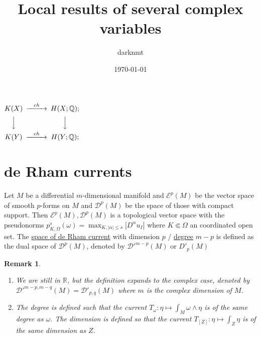 \documentclass[11pt]{article}
\author{darknmt}
\date{\today}
\title{Local results of several complex variables}
\newtheorem{remark}{Remark}
\begin{document}
\maketitle
\tableofcontents

\iffalse
\begin{info}
The PDF version of this page can be downloaded by replacing \texttt{html} in the its address by
\texttt{pdf}. 
For example \texttt{/html/sheaf-cohomology.html} should become \texttt{/pdf/sheaf-cohomology.pdf}.
\end{info}
\fi
$
\begin{CD}
K(X) @>{ch}>> H(X;\mathbb Q);\\
@VVV @VVV \\
K(Y) @>{ch}>> H(Y;\mathbb Q);
\end{CD}
$

\section{de Rham currents}
\label{sec:org845c3b4}

Let \(M\) be a differential \(m\)-dimensional manifold and \(\mathcal{E}^p(M)\) be
the vector space of smooth \(p\)-forms on \(M\) and \(\mathcal{D}^p(M)\) be the
space of those with compact support. Then \(\mathcal{E}^p(M), \mathcal{D}^p(M)\) is a topological vector
space with the pseudonorms \(p_{K,\Omega}^s(\omega) = \max_{K, |\alpha|\leq s}|D^\alpha
  u_I|\) where \(K\Subset \Omega\) an coordinated open set. The \uline{space of de Rham
current} with dimension \(p\) / \uline{degree} \(m - p\) is defined as the dual space of
\(\mathcal{D}^p(M)\), denoted by \(\mathcal{D}'^{m-p}(M)\) or \(D'_{p}(M)\)

\begin{remark}
\begin{enumerate}
\item We are still in \(\mathbb{R}\), but the definition expands to the complex case,
denoted by \(\mathcal{D}'^{m-p, m-q}(M) = \mathcal{D}'_{p,q}(M)\) where \(m\) is
the complex dimension of \(M\).
\item The degree is defined such that the current \(T_\omega: \eta \mapsto \int_M
   \omega\wedge\eta\) is of the same degree as \(\omega\). The dimension is defined so
that the current \(T_{[Z]}: \eta \mapsto \int_Z \eta\) is of the same dimension as \(Z\).
\end{enumerate}
\end{remark}
\end{document}
